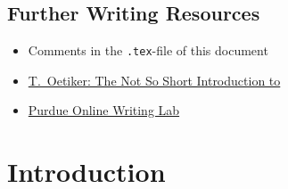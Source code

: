 \subsection{Further Writing Resources}
\begin{itemize}
	\item Comments in the {\tt.tex}-file of this document
\item \href{https://tobi.oetiker.ch/lshort/lshort.pdf}{T.~Oetiker: The Not So Short Introduction to \LaTeXe}
\item \href{https://owl.english.purdue.edu/owl/}{Purdue Online Writing Lab}

\end{itemize}





\newpage
\begin{abstract}
Brief summary, about one sentence per section. 
\end{abstract}



\section{Introduction}


